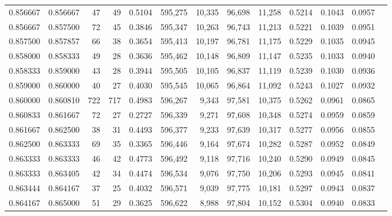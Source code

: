 \begin{tabular}{rrrrrrrrrrrrr}
0.856667 & 0.856667 &    47 &  49 &                                     0.5104 & 595,275 &  10,335 &  96,698 &  11,258 & 0.5214 & 0.1043 & 0.0957 \\
0.856667 & 0.857500 &    72 &  45 &                                     0.3846 & 595,347 &  10,263 &  96,743 &  11,213 & 0.5221 & 0.1039 & 0.0951 \\
0.857500 & 0.857857 &    66 &  38 &                                     0.3654 & 595,413 &  10,197 &  96,781 &  11,175 & 0.5229 & 0.1035 & 0.0945 \\
0.858000 & 0.858333 &    49 &  28 &                                     0.3636 & 595,462 &  10,148 &  96,809 &  11,147 & 0.5235 & 0.1033 & 0.0940 \\
0.858333 & 0.859000 &    43 &  28 &                                     0.3944 & 595,505 &  10,105 &  96,837 &  11,119 & 0.5239 & 0.1030 & 0.0936 \\
0.859000 & 0.860000 &    40 &  27 &                                     0.4030 & 595,545 &  10,065 &  96,864 &  11,092 & 0.5243 & 0.1027 & 0.0932 \\
0.860000 & 0.860810 &   722 & 717 &                                     0.4983 & 596,267 &   9,343 &  97,581 &  10,375 & 0.5262 & 0.0961 & 0.0865 \\
0.860833 & 0.861667 &    72 &  27 &                                     0.2727 & 596,339 &   9,271 &  97,608 &  10,348 & 0.5274 & 0.0959 & 0.0859 \\
0.861667 & 0.862500 &    38 &  31 &                                     0.4493 & 596,377 &   9,233 &  97,639 &  10,317 & 0.5277 & 0.0956 & 0.0855 \\
0.862500 & 0.863333 &    69 &  35 &                                     0.3365 & 596,446 &   9,164 &  97,674 &  10,282 & 0.5287 & 0.0952 & 0.0849 \\
0.863333 & 0.863333 &    46 &  42 &                                     0.4773 & 596,492 &   9,118 &  97,716 &  10,240 & 0.5290 & 0.0949 & 0.0845 \\
0.863333 & 0.863405 &    42 &  34 &                                     0.4474 & 596,534 &   9,076 &  97,750 &  10,206 & 0.5293 & 0.0945 & 0.0841 \\
0.863444 & 0.864167 &    37 &  25 &                                     0.4032 & 596,571 &   9,039 &  97,775 &  10,181 & 0.5297 & 0.0943 & 0.0837 \\
0.864167 & 0.865000 &    51 &  29 &                                     0.3625 & 596,622 &   8,988 &  97,804 &  10,152 & 0.5304 & 0.0940 & 0.0833 \\

\end{tabular}
